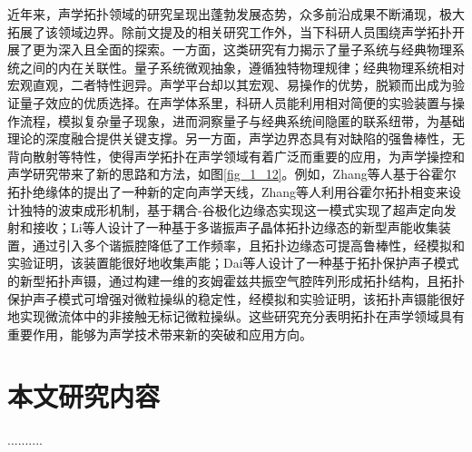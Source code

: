 近年来，声学拓扑领域的研究呈现出蓬勃发展态势，众多前沿成果不断涌现，极大拓展了该领域边界。除前文提及的相关研究工作外，当下科研人员围绕声学拓扑开展了更为深入且全面的探索\cite{j1,j2,j3,j4,j5,j6,j7,j8,j9,j10,j11,j12,j13,j14,j15,j16,j17}。一方面，这类研究有力揭示了量子系统与经典物理系统之间的内在关联性。量子系统微观抽象，遵循独特物理规律；经典物理系统相对宏观直观，二者特性迥异。声学平台却以其宏观、易操作的优势，脱颖而出成为验证量子效应的优质选择。在声学体系里，科研人员能利用相对简便的实验装置与操作流程，模拟复杂量子现象，进而洞察量子与经典系统间隐匿的联系纽带，为基础理论的深度融合提供关键支撑。另一方面，声学边界态具有对缺陷的强鲁棒性，无背向散射等特性，使得声学拓扑在声学领域有着广泛而重要的应用，为声学操控和声学研究带来了新的思路和方法，如图\ref{fig_1_12}。例如，Zhang等人基于谷霍尔拓扑绝缘体的提出了一种新的定向声学天线，Zhang等人利用谷霍尔拓扑相变来设计独特的波束成形机制，基于耦合-谷极化边缘态实现这一模式实现了超声定向发射和接收\cite{j2}；Li等人设计了一种基于多谐振声子晶体拓扑边缘态的新型声能收集装置，通过引入多个谐振腔降低了工作频率，且拓扑边缘态可提高鲁棒性，经模拟和实验证明，该装置能很好地收集声能\cite{j17}；Dai等人设计了一种基于拓扑保护声子模式的新型拓扑声镊，通过构建一维的亥姆霍兹共振空气腔阵列形成拓扑结构，且拓扑保护声子模式可增强对微粒操纵的稳定性，经模拟和实验证明，该拓扑声镊能很好地实现微流体中的非接触无标记微粒操纵\cite{j13}。这些研究充分表明拓扑在声学领域具有重要作用，能够为声学技术带来新的突破和应用方向。

\section{本文研究内容}

..........